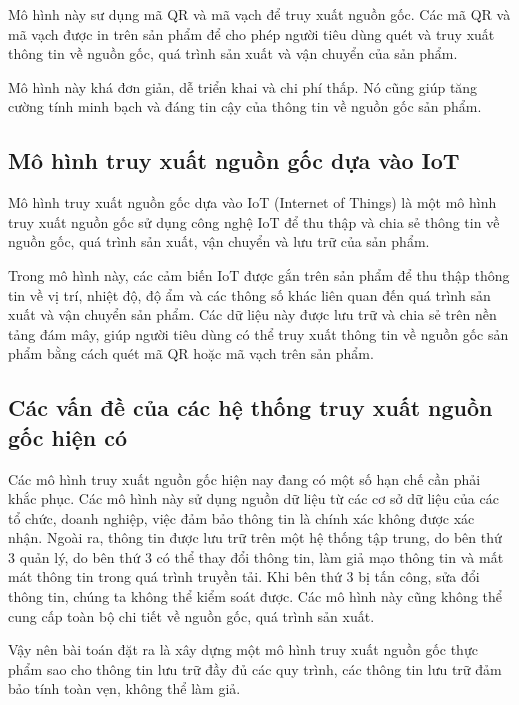 Mô hình này sư dụng mã QR và mã vạch để truy xuất nguồn gốc. Các mã QR và mã vạch 
được in trên sản phẩm để cho phép người tiêu dùng quét và truy xuất thông tin về 
nguồn gốc, quá trình sản xuất và vận chuyển của sản phẩm.

Mô hình này khá đơn giản, dễ triển khai và chi phí thấp. Nó cũng giúp tăng cường 
tính minh bạch và đáng tin cậy của thông tin về nguồn gốc sản phẩm.
\subsection{Mô hình truy xuất nguồn gốc dựa vào IoT }
Mô hình truy xuất nguồn gốc dựa vào IoT (Internet of Things) là một mô hình truy 
xuất nguồn gốc sử dụng công nghệ IoT để thu thập và chia sẻ thông tin về nguồn gốc, 
quá trình sản xuất, vận chuyển và lưu trữ của sản phẩm.

Trong mô hình này, các cảm biến IoT được gắn trên sản phẩm để thu thập thông tin 
về vị trí, nhiệt độ, độ ẩm và các thông số khác liên quan đến quá trình sản xuất 
và vận chuyển sản phẩm. Các dữ liệu này được lưu trữ và chia sẻ trên nền tảng 
đám mây, giúp người tiêu dùng có thể truy xuất thông tin về nguồn gốc sản phẩm 
bằng cách quét mã QR hoặc mã vạch trên sản phẩm.

\subsection{Các vấn đề của các hệ thống truy xuất nguồn gốc hiện có}

Các mô hình truy xuất nguồn gốc hiện nay đang có một số hạn chế cần phải khắc phục. 
Các mô hình này sử dụng nguồn dữ liệu từ các cơ sở dữ liệu của các tổ chức, doanh
nghiệp, việc đảm bảo thông tin là chính xác không được xác nhận. Ngoài ra, thông 
tin được lưu trữ trên một hệ thống tập trung, do bên thứ 3 quản lý, do bên thứ 3
có thể thay đổi thông tin, làm giả mạo thông tin và mất mát thông tin trong quá
trình truyền tải. Khi bên thứ 3 bị tấn công, sửa đổi thông tin, chúng ta không 
thể kiểm soát được. Các mô hình này cũng không thể cung cấp toàn bộ chi tiết 
về nguồn gốc, quá trình sản xuất.

Vậy nên bài toán đặt ra là xây dựng một mô hình truy xuất nguồn gốc thực phẩm
sao cho thông tin lưu trữ đầy đủ các quy trình, các thông tin lưu trữ đảm bảo tính
toàn vẹn, không thể làm giả.



